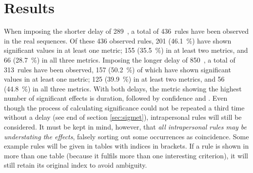 \section{Results}
\label{sec:sigres}
When imposing the shorter delay of 289~\ms, a total of 436~rules have been observed in the real sequences.
Of these 436 observed rules, 201 (46.1~\%) have shown significant values in at least one metric; 155 (35.5~\%) in at least two metrics, and 66 (28.7~\%) in all three metrics.
Imposing the longer delay of 850~\ms, a total of 313~rules have been observed, 157 (50.2~\%) of which have shown significant values in at least one metric; 125 (39.9~\%) in at least two metrics, and 56 (44.8~\%) in all three metrics.
With both delays, the metric showing the highest number of significant effects is duration, followed by confidence and \noc.
Even though the process of calculating significance could not be repeated a third time without a delay (see end of section \ref{sec:sigmet}), intrapersonal rules will still be considered.
It must be kept in mind, however, that \emph{all intrapersonal rules may be understating the effects}, falsely sorting out some occurrences as coincidence.
Some example rules will be given in tables with indices in brackets.
If a rule is shown in more than one table (because it fulfils more than one interesting criterion), it will still retain its original index to avoid ambiguity.


